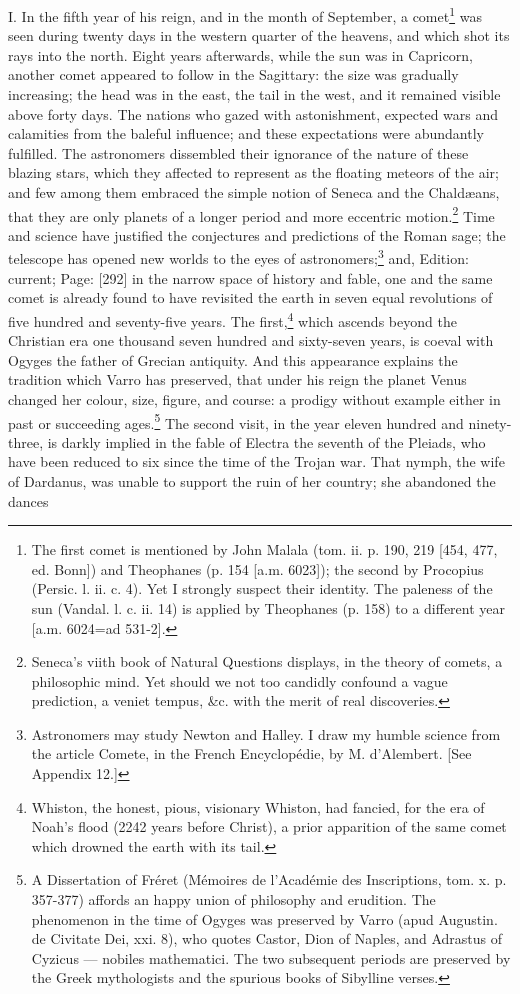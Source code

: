 I. In the fifth year of his reign, and in the month of September, a comet\footnote{The first comet is mentioned by John Malala (tom. ii. p. 190, 219 [454, 477, ed. Bonn]) and Theophanes (p. 154 [a.m. 6023]); the second by Procopius (Persic. l. ii. c. 4). Yet I strongly suspect their identity. The paleness of the sun (Vandal. l. c. ii. 14) is applied by Theophanes (p. 158) to a different year [a.m. 6024=ad 531-2].} was seen during twenty days in the western quarter of the heavens, and which shot its rays into the north. Eight years afterwards, while the sun was in Capricorn, another comet appeared to follow in the Sagittary: the size was gradually increasing; the head was in the east, the tail in the west, and it remained visible above forty days. The nations who gazed with astonishment, expected wars and calamities from the baleful influence; and these expectations were abundantly fulfilled. The astronomers dissembled their ignorance of the nature of these blazing stars, which they affected to represent as the floating meteors of the air; and few among them embraced the simple notion of Seneca and the Chaldæans, that they are only planets of a longer period and more eccentric motion.\footnote{Seneca\texthebrew{}’s viith book of Natural Questions displays, in the theory of comets, a philosophic mind. Yet should we not too candidly confound a vague prediction, a veniet tempus, \&c. with the merit of real discoveries.} Time and science have justified the conjectures and predictions of the Roman sage; the telescope has opened new worlds to the eyes of astronomers;\footnote{Astronomers may study Newton and Halley. I draw my humble science from the article Comete, in the French Encyclopédie, by M. d\texthebrew{}’Alembert. [See Appendix 12.]} and, Edition: current; Page: [292] in the narrow space of history and fable, one and the same comet is already found to have revisited the earth in seven equal revolutions of five hundred and seventy-five years. The first,\footnote{Whiston, the honest, pious, visionary Whiston, had fancied, for the era of Noah\texthebrew{}’s flood (2242 years before Christ), a prior apparition of the same comet which drowned the earth with its tail.} which ascends beyond the Christian era one thousand seven hundred and sixty-seven years, is coeval with Ogyges the father of Grecian antiquity. And this appearance explains the tradition which Varro has preserved, that under his reign the planet Venus changed her colour, size, figure, and course: a prodigy without example either in past or succeeding ages.\footnote{A Dissertation of Fréret (Mémoires de l\texthebrew{}’Académie des Inscriptions, tom. x. p. 357-377) affords an happy union of philosophy and erudition. The phenomenon in the time of Ogyges was preserved by Varro (apud Augustin. de Civitate Dei, xxi. 8), who quotes Castor, Dion of Naples, and Adrastus of Cyzicus \texthebrew{—} nobiles mathematici. The two subsequent periods are preserved by the Greek mythologists and the spurious books of Sibylline verses.} The second visit, in the year eleven hundred and ninety-three, is darkly implied in the fable of Electra the seventh of the Pleiads, who have been reduced to six since the time of the Trojan war. That nymph, the wife of Dardanus, was unable to support the ruin of her country; she abandoned the dances 